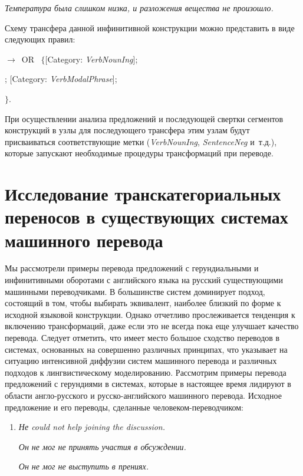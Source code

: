 \begin{multicols}{2}
\begin{enumerate}[(1)]
\textit{Температура была слишком низка, и разложения вещества не
произошло.}
\end{enumerate}

Схему трансфера данной инфинитивной конструкции можно представить
в виде следующих правил:

\;$\rightarrow$~OR~  $\{$[Category:
\textit{VerbNounIng}];

; [Category:
\textit{VerbModalPhrase}];

$\}$.

При осуществлении анализа предложений и последующей свертки
сегментов конструкций в узлы для последующего трансфера этим узлам
будут присваиваться соответствующие метки (\textit{VerbNounIng},
\textit{SentenceNeg} и~т.д.), которые запускают необходимые процедуры
трансформаций при переводе.

\section{Исследование транскатегориальных переносов в
существующих системах машинного перевода}

Мы рассмотрели примеры перевода предложений с герундиальными и инфинитивными 
оборотами с английского языка на русский су\-ще\-ст\-ву\-ющи\-ми машинными 
переводчиками. В большинстве систем доминирует подход, состоящий в том, чтобы 
выбирать эквивалент, наиболее близкий по форме к исходной языковой конструкции. 
Однако отчетливо прослеживается тенденция к включению трансформаций, даже если 
это не всегда пока еще улучшает качество перевода. Следует отметить, что имеет 
место большое сходство переводов в системах, основанных на совершенно различных 
принципах, что указывает на ситуацию интенсивной диффузии систем машинного 
перевода и различных подходов к лингвистическому моделированию. Рассмотрим 
примеры перевода предложений с герундиями в сис\-те\-мах, которые в настоящее 
время лидируют в области англо-русского и русско-английского машинного 
перевода. Исходное предложение и его переводы, сделанные 
человеком-переводчиком:
\begin{enumerate}[(12)]
\item \textit{Не could not help joining the discussion.}

\textit{Он не мог не принять участия в обсуждении.}

\textit{Он не мог не выступить в прениях.}
\end{enumerate}


\end{multicols}
